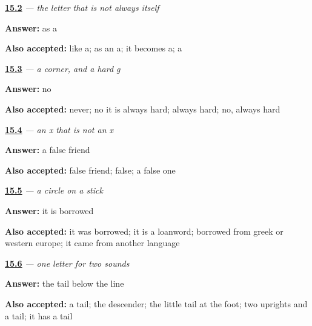 \noindent\begin{minipage}[t]{\linewidth}
\raggedright
\hyperlink{review-RU-W07-o-unstressed}{\textbf{15.2}} \emph{ — the letter that is not always itself}\par
\small \textbf{Answer:} as a\par
\footnotesize \textbf{Also accepted:} like a; as an a; it becomes a; a
\end{minipage}\par\medskip

\noindent\begin{minipage}[t]{\linewidth}
\raggedright
\hyperlink{review-RU-W07-g-sound}{\textbf{15.3}} \emph{ — a corner, and a hard g}\par
\small \textbf{Answer:} no\par
\footnotesize \textbf{Also accepted:} never; no it is always hard; always hard; no, always hard
\end{minipage}\par\medskip

\noindent\begin{minipage}[t]{\linewidth}
\raggedright
\hyperlink{review-RU-W07-kh-kind}{\textbf{15.4}} \emph{ — an x that is not an x}\par
\small \textbf{Answer:} a false friend\par
\footnotesize \textbf{Also accepted:} false friend; false; a false one
\end{minipage}\par\medskip

\noindent\begin{minipage}[t]{\linewidth}
\raggedright
\hyperlink{review-RU-W07-f-borrowed}{\textbf{15.5}} \emph{ — a circle on a stick}\par
\small \textbf{Answer:} it is borrowed\par
\footnotesize \textbf{Also accepted:} it was borrowed; it is a loanword; borrowed from greek or western europe; it came from another language
\end{minipage}\par\medskip

\noindent\begin{minipage}[t]{\linewidth}
\raggedright
\hyperlink{review-RU-W07-ts-tail}{\textbf{15.6}} \emph{ — one letter for two sounds}\par
\small \textbf{Answer:} the tail below the line\par
\footnotesize \textbf{Also accepted:} a tail; the descender; the little tail at the foot; two uprights and a tail; it has a tail
\end{minipage}\par\medskip

